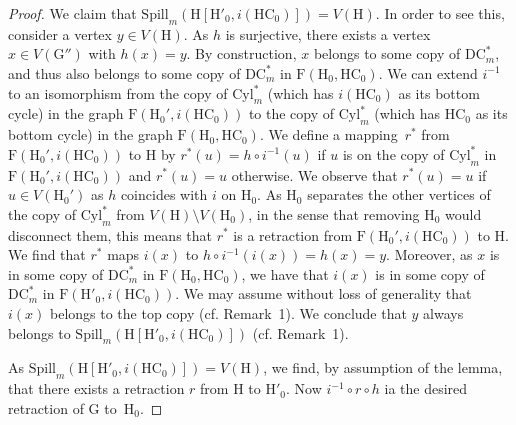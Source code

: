 \documentclass[a4paper,12pt]{article}
\theoremstyle{remark}
\newcommand{\HC}[0]{\ensuremath{\mathrm{HC}}}
\newcommand{\DCm}[0]{\ensuremath{\mathrm{DC}^*_m}}
\newcommand{\Cylm}[0]{\ensuremath{\mathrm{Cyl}^*_m}}
\newcommand{\G}{\ensuremath{\mathrm{G}}}
\newcommand{\F}{\ensuremath{\mathrm{F}}}
\renewcommand{\H}{\ensuremath{\mathrm{H}}}
\begin{document}
\begin{proof}
We claim that $\mathrm{Spill}_m(\H[\H'_0,i(\HC_0)]) = V(\H)$. In order to see this, consider a vertex $y\in V(\H)$. 
As $h$ is surjective, there exists a vertex~$x\in V(\G'')$ with $h(x)=y$. By construction, $x$ belongs to some copy of $\DCm$, and thus also belongs to some copy of $\DCm$ in $\F(\H_0,\HC_0)$.
We can extend $i^{-1}$ to an isomorphism from the copy of $\Cylm$  (which has $i(\HC_0)$ as its bottom cycle)  in the graph $\F(\H_0',i(\HC_0))$ to the copy of $\Cylm$ (which has $\HC_0$ as its bottom cycle) in the graph $\F(\H_0,\HC_0)$.
We define a mapping~$r^*$ from $\F(\H_0',i(\HC_0))$ to $\H$ by $r^*(u)=h\circ i^{-1}(u)$ if $u$ is on the copy of $\Cylm$ in $\F(\H_0',i(\HC_0))$ and $r^*(u)=u$ otherwise. We observe that $r^*(u)=u$ if $u\in V(\H_0')$ as $h$ coincides with $i$ on $\H_0$. As $\H_0$ separates the other vertices of 
the copy of $\Cylm$ from $V(\H)\setminus V(\H_0)$, in the sense that removing $\H_0$ would disconnect them, this means that $r^*$ is a retraction from $\F(\H_0',i(\HC_0))$ to $\H$. We find that $r^*$ maps $i(x)$ to $h\circ i^{-1}(i(x))=h(x)=y$. Moreover, as $x$ is in some copy of $\DCm$ in $\F(\H_0,\HC_0)$, we have that $i(x)$ is in some copy of $\DCm$ in $\F(\H'_0,i(\HC_0))$. We may assume without loss of generality that $i(x)$ belongs to the top copy (cf. Remark~1). We conclude that $y$ always belongs to  $\mathrm{Spill}_m(\H[\H'_0,i(\HC_0)])$ (cf. Remark~1).

As $\mathrm{Spill}_m(\H[\H'_0,i(\HC_0)]) = V(\H)$, we find, by assumption of the lemma, that there exists a retraction $r$ from $\H$ to $\H'_0$.  
Now $i^{-1} \circ r \circ h$ ia the desired retraction of $\G$ to~$\H_0$.  
\end{proof}
\end{document}
